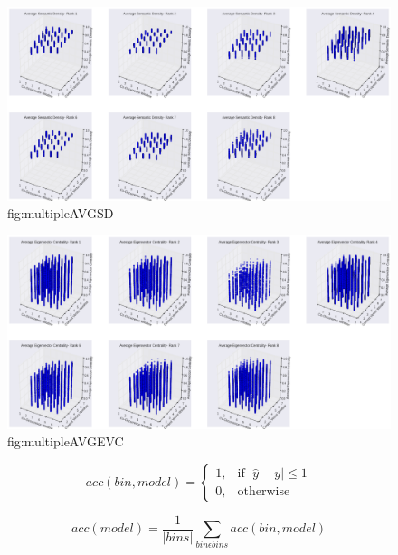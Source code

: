 \documentclass[11pt]{article}
\begin{document}
\begin{figure}[ht]
\begin{center}
\includegraphics[width = \textwidth]{figs/multipleAVGSD}
\caption{fig:multipleAVGSD}
\label{default}
\end{center}
\end{figure}

\begin{figure}[ht]
\begin{center}
\includegraphics[width = \textwidth]{figs/multipleAVGEVC}
\caption{fig:multipleAVGEVC}
\label{default}
\end{center}
\end{figure}


\begin{equation}
acc(bin, model) = 
\begin{cases} 
1, & \text{if } |\hat{y}-y| \leq 1 \\
0, & \text{otherwise}
\end{cases}
\end{equation}

\begin{equation}
acc(model) = \frac{1}{|bins|} \sum_{bin  \epsilon  bins} acc(bin, model)
\end{equation}
\end{document}

